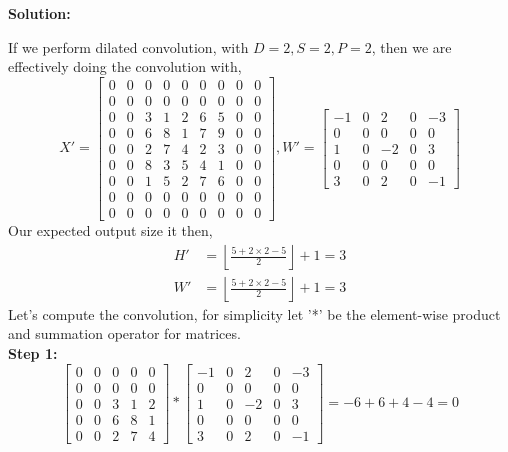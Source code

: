 \documentclass{article}
\newenvironment{solution}
  {\par\noindent\textbf{Solution:}\par}
  {\par}
\begin{document}
\begin{solution}
  If we perform dilated convolution, with $D=2,S=2,P=2$, then we are effectively doing the convolution with, 
  \[ 
  X' =  \begin{bmatrix}
    0 & 0 & 0 & 0 & 0 & 0 & 0 & 0 & 0 \\ 
    0 & 0 & 0 & 0 & 0 & 0 & 0 & 0 & 0 \\ 
    0 & 0 & 3 & 1 & 2 & 6 & 5 & 0 & 0 \\ 
    0 & 0 & 6 & 8 & 1 & 7 & 9 & 0 & 0 \\ 
    0 & 0 & 2 & 7 & 4 & 2 & 3 & 0 & 0 \\ 
    0 & 0 & 8 & 3 & 5 & 4 & 1 & 0 & 0 \\ 
    0 & 0 & 1 & 5 & 2 & 7 & 6 & 0 & 0 \\ 
    0 & 0 & 0 & 0 & 0 & 0 & 0 & 0 & 0 \\ 
    0 & 0 & 0 & 0 & 0 & 0 & 0 & 0 & 0  
    \end{bmatrix}, W' = \begin{bmatrix}
-1 & 0 & 2 & 0 & -3  \\
0 & 0 & 0 & 0 & 0 \\
1 & 0 & -2 & 0 & 3 \\
0 & 0 & 0 & 0 & 0 \\
3 & 0 & 2 & 0 & -1
\end{bmatrix} 
  \]
Our expected output size it then,
\[
  \begin{aligned}
H' &=\left\lfloor   \frac{5 + 2 \times 2 -5 }{2 }  \right\rfloor  + 1 = 3 \\ 
W' &= \left\lfloor   \frac{ 5 + 2 \times 2 -5}{2}  \right\rfloor +1 = 3
\end{aligned}
\]
Let's compute the convolution, for simplicity let '*' be the element-wise product and summation operator for matrices.\\  
\textbf{Step 1:}
\[
\begin{bmatrix}
0 & 0 & 0 & 0 & 0 \\
0 & 0 & 0 & 0 & 0 \\
0 & 0 & 3 & 1 & 2 \\
0 & 0 & 6 & 8 & 1 \\
0 & 0 & 2 & 7 & 4
\end{bmatrix} * \begin{bmatrix}
-1 & 0 & 2 & 0 & -3  \\
0 & 0 & 0 & 0 & 0 \\
1 & 0 & -2 & 0 & 3 \\
0 & 0 & 0 & 0 & 0 \\
3 & 0 & 2 & 0 & -1
\end{bmatrix} = -6 + 6+4-4 = 0
\]
\end{solution}
\end{document}
